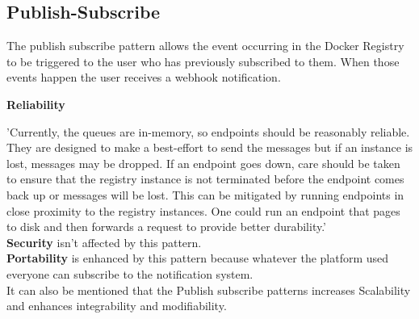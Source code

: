 \subsection{Publish-Subscribe}

The publish subscribe pattern allows the event occurring in the Docker Registry to be triggered to the user who has previously subscribed to them. When those events happen the user receives a webhook notification.

\textbf{Reliability}

'Currently, the queues are in-memory, so endpoints should be reasonably reliable. They are designed to make a best-effort to send the messages but if an instance is lost, messages may be dropped. If an endpoint goes down, care should be taken to ensure that the registry instance is not terminated before the endpoint comes back up or messages will be lost.
This can be mitigated by running endpoints in close proximity to the registry instances. One could run an endpoint that pages to disk and then forwards a request to provide better durability.' \\

\textbf{Security} isn't affected by this pattern.\\
\textbf{Portability} is enhanced by this pattern because whatever the platform used everyone can subscribe to the notification system.\\

It can also be mentioned that the Publish subscribe patterns increases Scalability and enhances integrability and modifiability.

